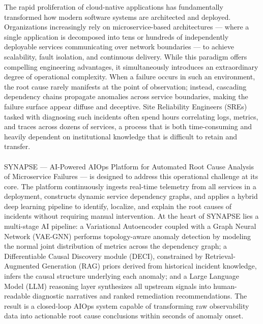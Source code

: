
\hspace*{0.3in} The rapid proliferation of cloud-native applications has fundamentally transformed how modern software systems are architected and deployed. Organizations increasingly rely on microservice-based architectures — where a single application is decomposed into tens or hundreds of independently deployable services communicating over network boundaries — to achieve scalability, fault isolation, and continuous delivery. While this paradigm offers compelling engineering advantages, it simultaneously introduces an extraordinary degree of operational complexity. When a failure occurs in such an environment, the root cause rarely manifests at the point of observation; instead, cascading dependency chains propagate anomalies across service boundaries, making the failure surface appear diffuse and deceptive. Site Reliability Engineers (SREs) tasked with diagnosing such incidents often spend hours correlating logs, metrics, and traces across dozens of services, a process that is both time-consuming and heavily dependent on institutional knowledge that is difficult to retain and transfer.\\\\

\hspace*{0.3in} SYNAPSE — AI-Powered AIOps Platform for Automated Root Cause Analysis of Microservice Failures — is designed to address this operational challenge at its core. The platform continuously ingests real-time telemetry from all services in a deployment, constructs dynamic service dependency graphs, and applies a hybrid deep learning pipeline to identify, localize, and explain the root causes of incidents without requiring manual intervention. At the heart of SYNAPSE lies a multi-stage AI pipeline: a Variational Autoencoder coupled with a Graph Neural Network (VAE-GNN) performs topology-aware anomaly detection by modeling the normal joint distribution of metrics across the dependency graph; a Differentiable Causal Discovery module (DECI), constrained by Retrieval-Augmented Generation (RAG) priors derived from historical incident knowledge, infers the causal structure underlying each anomaly; and a Large Language Model (LLM) reasoning layer synthesizes all upstream signals into human-readable diagnostic narratives and ranked remediation recommendations. The result is a closed-loop AIOps system capable of transforming raw observability data into actionable root cause conclusions within seconds of anomaly onset.\\\\

